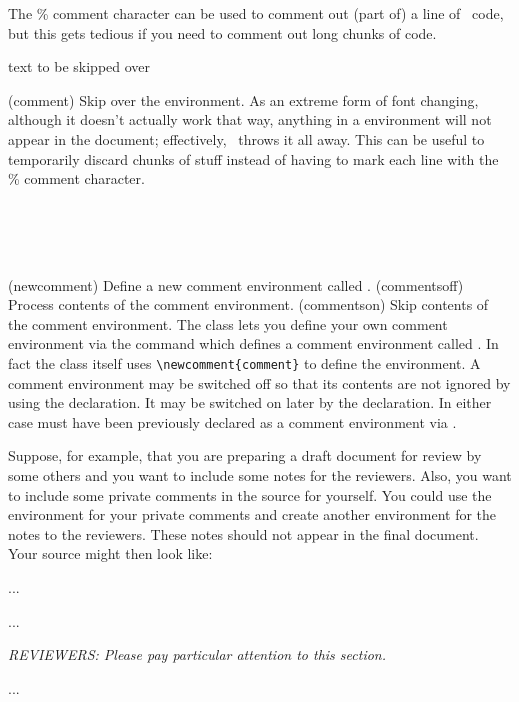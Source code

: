     The \% comment character can be used to comment out (part of) a
line of \tx\ code, but this gets tedious if you need to comment out
long chunks of code.

\begin{syntax}
 text to be skipped over  \\
\end{syntax}
\glossary(comment)%
  {}%
  {Skip over the environment.}
As an extreme form of font changing, although it doesn't actually work that 
way, anything in a  environment will not appear in the
document; effectively, \ltx\ throws it all away. This can be useful
to temporarily discard chunks of stuff instead of having to mark each line
with the \% comment character. 

\begin{syntax}
\cmd{\newcomment} \\
\cmd{\commentsoff} \\
\cmd{\commentson} \\
\end{syntax}
\glossary(newcomment)%
  {}%
  {Define a new comment environment called .}
\glossary(commentsoff)%
  {}%
  {Process contents of the  comment environment.}
\glossary(commentson)%
  {}%
  {Skip contents of the  comment environment.}
The class lets you define your own comment environment via the 
\cmd{\newcomment} command which defines a comment environment called
. In fact the class itself uses \verb?\newcomment{comment}? to
define the  environment. A comment environment 
may be switched off so that its contents are not ignored by using the
\cmd{\commentsoff} declaration. It may be switched on later by the
\cmd{\commentson} declaration. In either case  must have
been previously declared as a comment environment via \cmd{\newcomment}.

    Suppose, for example, that you are preparing a draft document for 
review by some others and you want to include some notes for the reviewers.
Also, you want to include some private comments in the source for yourself.
You could use the  environment for your private comments and
create another environment for the notes to the reviewers. These notes
should not appear in the final document. Your source might then look like:
\begin{lcode}
\ifdraftdoc\else
\fi
...
\begin{comment}
Remember to finagle the wingle!
\end{comment}
...
\begin{review}
\textit{REVIEWERS: Please pay particular attention to this section.}
\end{review}
...
\end{lcode}


